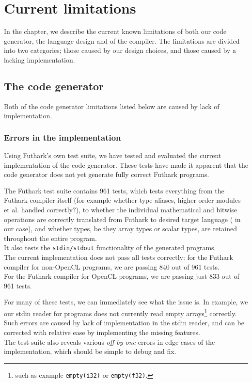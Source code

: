 \chapter{Current limitations}
\label{sec:currentlimitations}
In the chapter, we describe the current known limitations of both our code
generator, the \fshark{} language design and of the \fshark{} compiler. The
limitations are divided into two categories; those caused by our design choices,
and those caused by a lacking implementation.

\section{The \csharp{} code generator}
Both of the code generator limitations listed below are caused by lack of
implementation.

\subsection{Errors in the implementation}
\label{sec:errorsintheimplementation}
Using Futhark's own test suite, we have tested and evaluated the current
implementation of the code generator.
These tests have made it apparent that the \csharp{} code
generator does not yet generate fully correct Futhark programs. 

The Futhark test suite contains 961 tests, which tests everything from the
Futhark compiler itself (for example whether type aliases,
higher order modules et al. handled correctly?),
to whether the individual mathematical and bitwise operations are correctly
translated from Futhark to desired target language (\csharp{} in our case), and
whether types, be they array types or scalar types, are retained throughout the
entire program.
\\
It also tests the \texttt{stdin/stdout} functionality of the generated programs.
\\
The current implementation does not pass all tests correctly: for the Futhark
\csharp{} compiler for non-OpenCL programs, we are passing 840 out of 961 tests.\\
For the Futhark \csharp{} compiler for OpenCL programs, we are passing just 833
out of 961 tests.

For many of these tests, we can immediately see what the issue is. In example,
we our stdin reader for \csharp{} programs does not currently read empty
arrays\footnote{such as example \texttt{empty(i32)} or \texttt{empty(f32)}.}
correctly. Such errors are caused by lack of implementation in the stdin reader, and can be
corrected with relative ease by implementing the missing features.\\
The test suite also reveals various \textit{off-by-one} errors in edge cases of
the implementation, which should be simple to debug and fix.

